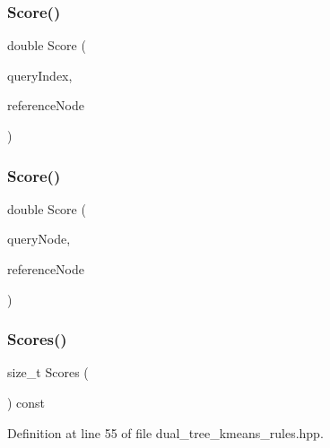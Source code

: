 \subsubsection{Score()\hspace{0.1cm}{\footnotesize\ttfamily [1/2]}}
{\footnotesize\ttfamily double Score (\begin{DoxyParamCaption}\item[{const size\+\_\+t}]{query\+Index,  }\item[{Tree\+Type \&}]{reference\+Node }\end{DoxyParamCaption})}

\mbox{\label{classmlpack_1_1kmeans_1_1DualTreeKMeansRules_a05b142945ef94221b628a75961f48b02}} 
\subsubsection{Score()\hspace{0.1cm}{\footnotesize\ttfamily [2/2]}}
{\footnotesize\ttfamily double Score (\begin{DoxyParamCaption}\item[{Tree\+Type \&}]{query\+Node,  }\item[{Tree\+Type \&}]{reference\+Node }\end{DoxyParamCaption})}

\mbox{\label{classmlpack_1_1kmeans_1_1DualTreeKMeansRules_a4d1e40c0bf406280a237ca1b487e3c62}} 
\subsubsection{Scores()\hspace{0.1cm}{\footnotesize\ttfamily [1/2]}}
{\footnotesize\ttfamily size\+\_\+t Scores (\begin{DoxyParamCaption}{ }\end{DoxyParamCaption}) const\hspace{0.3cm}{\ttfamily [inline]}}



Definition at line 55 of file dual\+\_\+tree\+\_\+kmeans\+\_\+rules.\+hpp.

